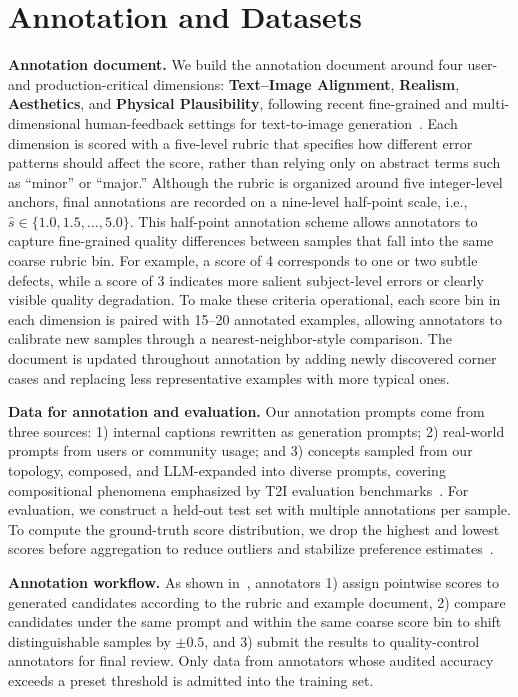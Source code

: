 \documentclass{article}
\begin{document}
\section{Annotation and Datasets}
\label{sec:annotation_and_datasets}

\textbf{Annotation document.} We build the annotation document around four user- and production-critical dimensions: \textbf{Text--Image Alignment}, \textbf{Realism}, \textbf{Aesthetics}, and \textbf{Physical Plausibility}, following recent fine-grained and multi-dimensional human-feedback settings for text-to-image generation~\cite{liang2024rich,zhang2024learning_mps}. Each dimension is scored with a five-level rubric that specifies how different error patterns should affect the score, rather than relying only on abstract terms such as ``minor'' or ``major.'' Although the rubric is organized around five integer-level anchors, final annotations are recorded on a nine-level half-point scale, i.e., 
$\hat{s}\in\{1.0,1.5,\ldots,5.0\}$. 
This half-point annotation scheme allows annotators to capture fine-grained quality differences between samples that fall into the same coarse rubric bin. For example, a score of 4 corresponds to one or two subtle defects, while a score of 3 indicates more salient subject-level errors or clearly visible quality degradation. To make these criteria operational, each score bin in each dimension is paired with 15--20 annotated examples, allowing annotators to calibrate new samples through a nearest-neighbor-style comparison. The document is updated throughout annotation by adding newly discovered corner cases and replacing less representative examples with more typical ones.

\textbf{Data for annotation and evaluation.} Our annotation prompts come from three sources: 1) internal captions rewritten as generation prompts; 2) real-world prompts from users or community usage; and 3) concepts sampled from our topology, composed, and LLM-expanded into diverse prompts, covering compositional phenomena emphasized by T2I evaluation benchmarks~\cite{hu2023tifa,ghosh2023geneval,huang2023t2icompbench,saharia2022photorealistic}. For evaluation, we construct a held-out test set with multiple annotations per sample. To compute the ground-truth score distribution, we drop the highest and lowest scores before aggregation to reduce outliers and stabilize preference estimates~\cite{uma2021learning,davani2022dealing}.

\textbf{Annotation workflow.} As shown in~, annotators 1) assign pointwise scores to generated candidates according to the rubric and example document, 2) compare candidates under the same prompt and within the same coarse score bin to shift distinguishable samples by $\pm 0.5$, and 3) submit the results to quality-control annotators for final review. Only data from annotators whose audited accuracy exceeds a preset threshold is admitted into the training set.
\end{document}
